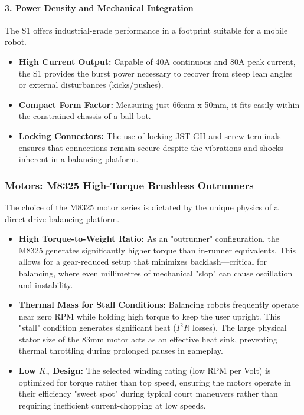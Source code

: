 \documentclass[12pt]{article}
\begin{document}
\paragraph{3. Power Density and Mechanical Integration}
The S1 offers industrial-grade performance in a footprint suitable for a mobile robot.
\begin{itemize}
    \item \textbf{High Current Output:} Capable of 40A continuous and 80A peak current, the S1 provides the burst power necessary to recover from steep lean angles or external disturbances (kicks/pushes).
    \item \textbf{Compact Form Factor:} Measuring just 66mm x 50mm, it fits easily within the constrained chassis of a ball bot.
    \item \textbf{Locking Connectors:} The use of locking JST-GH and screw terminals ensures that connections remain secure despite the vibrations and shocks inherent in a balancing platform.
\end{itemize}

\subsubsection{Motors: M8325 High-Torque Brushless Outrunners}
The choice of the M8325 motor series is dictated by the unique physics of a direct-drive balancing platform.
\begin{itemize}
    \item \textbf{High Torque-to-Weight Ratio:} As an "outrunner" configuration, the M8325 generates significantly higher torque than in-runner equivalents. This allows for a gear-reduced setup that minimizes backlash—critical for balancing, where even millimetres of mechanical "slop" can cause oscillation and instability.
    \item \textbf{Thermal Mass for Stall Conditions:} Balancing robots frequently operate near zero RPM while holding high torque to keep the user upright. This "stall" condition generates significant heat ($I^2R$ losses). The large physical stator size of the 83mm motor acts as an effective heat sink, preventing thermal throttling during prolonged pauses in gameplay.
    \item \textbf{Low $K_v$ Design:} The selected winding rating (low RPM per Volt) is optimized for torque rather than top speed, ensuring the motors operate in their efficiency "sweet spot" during typical court maneuvers rather than requiring inefficient current-chopping at low speeds.
\end{itemize}
\end{document}
